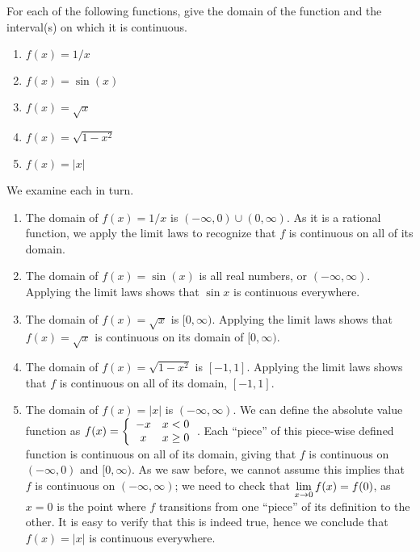 \begin{example}  %
For each of the following functions, give the domain of the function and the interval(s) on which it is continuous.

\begin{enumerate}[1)]
\item $f(x) = 1/x$			
\item $f(x) = \sin(x)$
\item $f(x) = \sqrt{x}$
\item $f(x) = \sqrt{1-x^2}$
\item $f(x) = |x|$		
\end{enumerate}

\solution We examine each in turn.	
\begin{enumerate}[1)]
\item The domain of $f(x) = 1/x$ is $(-\infty,0) \cup (0,\infty)$. As it is a rational function, we apply the limit laws to recognize that $f$ is continuous on all of its domain.

\item The domain of $f(x) = \sin(x)$ is all real numbers, or $(-\infty,\infty)$. Applying the limit laws shows that $\sin x$ is continuous everywhere.

\item The domain of $f(x) = \sqrt{x}$ is $[0,\infty)$. Applying the limit laws shows that $f(x) = \sqrt{x}$ is continuous on its domain of $[0,\infty)$.

\item The domain of $f(x) = \sqrt{1-x^2}$ is $[-1,1]$. Applying the limit laws shows that $f$ is continuous on all of its domain, $[-1,1]$.

\item The domain of $f(x) = |x|$ is $(-\infty,\infty)$. We can define the absolute value function as $\displaystyle f(x) = \left\{\begin{array}{cc} -x & x<0 \\ x & x\geq 0\end{array}\right.$. Each ``piece'' of this piece-wise defined function is continuous on all of its domain, giving that $f$ is continuous on $(-\infty,0)$ and $[0,\infty)$. As we saw before, we cannot assume this implies that $f$ is continuous on $(-\infty,\infty)$; we need to check that $\displaystyle \lim_{x \to 0}f(x) = f(0)$, as $x=0$ is the point where $f$ transitions from one ``piece'' of its definition to the other. It is easy to verify that this is indeed true, hence we conclude that $f(x) = |x|$ is continuous everywhere.
\end{enumerate}
\end{example}
